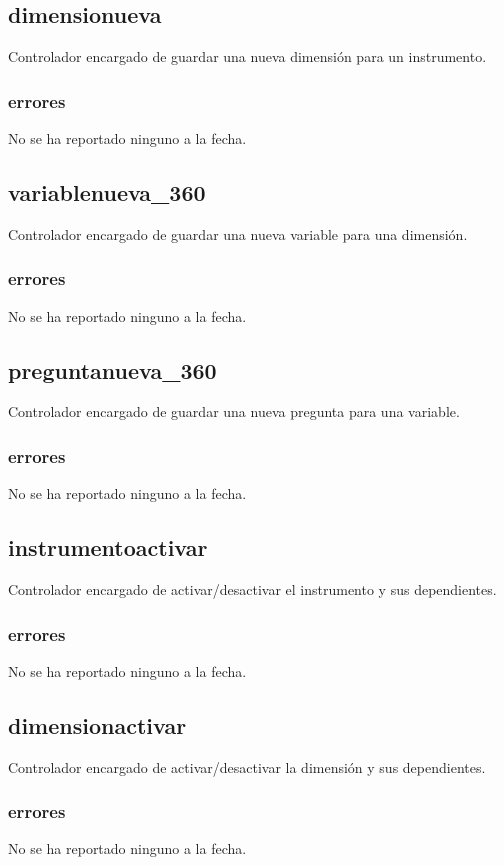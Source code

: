 \documentclass[10pt,a4paper]{book}
\begin{document}
	\subsection{dimensionueva}
	Controlador encargado de guardar una nueva dimensión para un instrumento. 
	\subsubsection{errores}
	No se ha reportado ninguno a la fecha.
	
	\subsection{variablenueva\_360}
	Controlador encargado de guardar una nueva variable para una dimensión.
	\subsubsection{errores}
	No se ha reportado ninguno a la fecha.
	
	\subsection{preguntanueva\_360}
	Controlador encargado de guardar una nueva pregunta para una variable.
	\subsubsection{errores}
	No se ha reportado ninguno a la fecha.
	
	\subsection{instrumentoactivar}
	Controlador encargado de activar/desactivar el instrumento y sus dependientes.
	\subsubsection{errores}
	No se ha reportado ninguno a la fecha.
	
	\subsection{dimensionactivar}
	Controlador encargado de activar/desactivar la dimensión y sus dependientes.
	\subsubsection{errores}
	No se ha reportado ninguno a la fecha.
	
\end{document}
